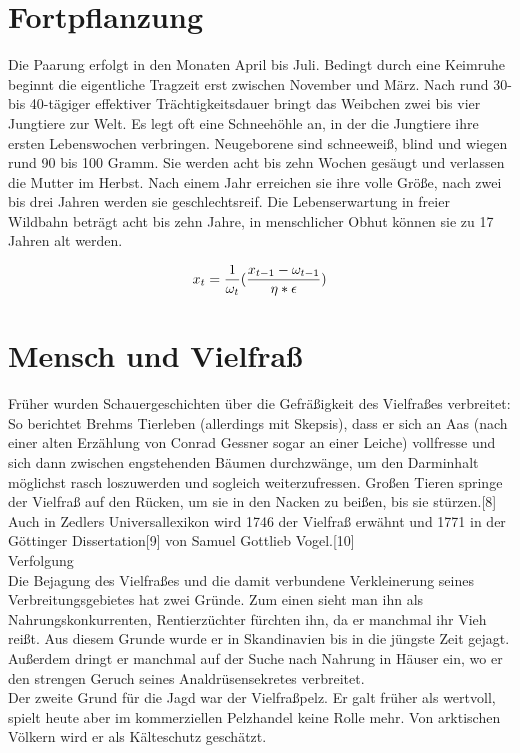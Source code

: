 \documentclass{scrartcl}
\begin{document}
\section{Fortpflanzung}

Die Paarung erfolgt in den Monaten April bis Juli. Bedingt durch eine Keimruhe beginnt die eigentliche Tragzeit erst zwischen November und März. Nach rund 30- bis 40-tägiger effektiver Trächtigkeitsdauer bringt das Weibchen zwei bis vier Jungtiere zur Welt. Es legt oft eine Schneehöhle an, in der die Jungtiere ihre ersten Lebenswochen verbringen. Neugeborene sind schneeweiß, blind und wiegen rund 90 bis 100 Gramm. Sie werden acht bis zehn Wochen gesäugt und verlassen die Mutter im Herbst. Nach einem Jahr erreichen sie ihre volle Größe, nach zwei bis drei Jahren werden sie geschlechtsreif. Die Lebenserwartung in freier Wildbahn beträgt acht bis zehn Jahre, in menschlicher Obhut können sie zu 17 Jahren alt werden. 
\\
\begin{center}}
 Fortpflanzungsformel
  \end{center}
\begin{equation}
    x_t=\frac{1}{\omega_t}(\frac{x_{t-1}-\omega_{t-1}}{\eta*\epsilon})\\
\end{equation}



\section{Mensch und Vielfraß}

Früher wurden Schauergeschichten über die Gefräßigkeit des Vielfraßes verbreitet: So berichtet Brehms Tierleben (allerdings mit Skepsis), dass er sich an Aas (nach einer alten Erzählung von Conrad Gessner sogar an einer Leiche) vollfresse und sich dann zwischen engstehenden Bäumen durchzwänge, um den Darminhalt möglichst rasch loszuwerden und sogleich weiterzufressen. Großen Tieren springe der Vielfraß auf den Rücken, um sie in den Nacken zu beißen, bis sie stürzen.[8] Auch in Zedlers Universallexikon wird 1746 der Vielfraß erwähnt und 1771 in der Göttinger Dissertation[9] von Samuel Gottlieb Vogel.[10]
\\
Verfolgung
\\
Die Bejagung des Vielfraßes und die damit verbundene Verkleinerung seines Verbreitungsgebietes hat zwei Gründe. Zum einen sieht man ihn als Nahrungskonkurrenten, Rentierzüchter fürchten ihn, da er manchmal ihr Vieh reißt. Aus diesem Grunde wurde er in Skandinavien bis in die jüngste Zeit gejagt. Außerdem dringt er manchmal auf der Suche nach Nahrung in Häuser ein, wo er den strengen Geruch seines Analdrüsensekretes verbreitet.
\\
Der zweite Grund für die Jagd war der Vielfraßpelz. Er galt früher als wertvoll, spielt heute aber im kommerziellen Pelzhandel keine Rolle mehr. Von arktischen Völkern wird er als Kälteschutz geschätzt. 
\end{document}

